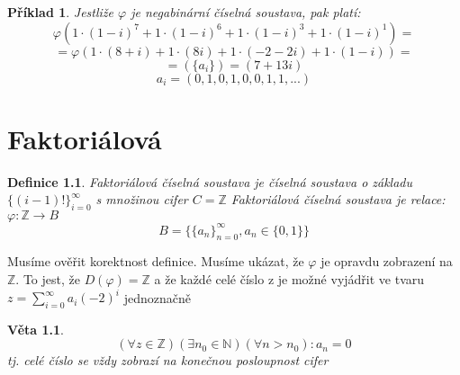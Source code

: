 \documentclass[12pt]{book}
\newtheorem{definice}{Definice}
\newtheorem{veta}{Věta}
\newtheorem{pr}{Příklad}
\begin{document}
\begin{pr}
	Jestliže $\varphi$ je negabinární číselná soustava, pak platí:
	$$\varphi(1\cdot(1-i)^7+1\cdot(1-i)^6+1\cdot(1-i)^3+1\cdot(1-i)^1)=$$
	$$=\varphi(1\cdot(8+i)+1\cdot(8i)+1\cdot(-2-2i)+1\cdot(1-i))=$$
	$$=(\{a_i\})=(7+13i)$$
	$${a_i}=(0,1,0,1,0,0,1,1,...) $$
\end{pr}


\chapter{Faktoriálová}

\begin{definice}
	Faktoriálová číselná soustava je číselná soustava o základu $\{(i-1)!\}_{i=0}^\infty$ s množinou cifer $C=\mathbb{Z}$\newline
	Faktoriálová číselná soustava je relace:
	$\varphi:\mathbb{Z}\to B$
	$$B=\{\{a_n\}_{n=0}^\infty,a_n \in \{0,1\} \}$$
\end{definice}
Musíme ověřit korektnost definice. Musíme ukázat, že $\varphi$ je opravdu zobrazení na $\mathbb{Z}$. To jest, že $D(\varphi)=\mathbb{Z}$ a že každé celé číslo z je možné vyjádřit ve tvaru $z=\sum_{i=0}^\infty a_i(-2)^i$ jednoznačně

\begin{veta}
	$$(\forall z \in \mathbb{Z})(\exists n_0 \in \mathbb{N}) (\forall n > n_0) : a_n = 0$$tj. celé číslo se vždy zobrazí na konečnou posloupnost cifer
\end{veta}
\end{document}

